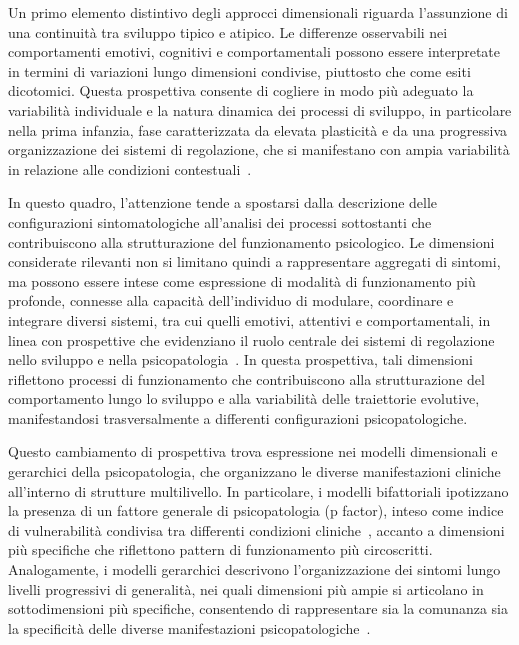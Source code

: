             Un primo elemento distintivo degli approcci dimensionali riguarda l'assunzione di una continuità tra sviluppo tipico e atipico. Le differenze osservabili nei comportamenti emotivi, cognitivi e comportamentali possono essere interpretate in termini di variazioni lungo dimensioni condivise, piuttosto che come esiti dicotomici. Questa prospettiva consente di cogliere in modo più adeguato la variabilità individuale e la natura dinamica dei processi di sviluppo, in particolare nella prima infanzia, fase caratterizzata da elevata plasticità e da una progressiva organizzazione dei sistemi di regolazione, che si manifestano con ampia variabilità in relazione alle condizioni contestuali~\cite{zelazo2020,beauchaine2019}.

            In questo quadro, l'attenzione tende a spostarsi dalla descrizione delle configurazioni sintomatologiche all'analisi dei processi sottostanti che contribuiscono alla strutturazione del funzionamento psicologico. Le dimensioni considerate rilevanti non si limitano quindi a rappresentare aggregati di sintomi, ma possono essere intese come espressione di modalità di funzionamento più profonde, connesse alla capacità dell'individuo di modulare, coordinare e integrare diversi sistemi, tra cui quelli emotivi, attentivi e comportamentali, in linea con prospettive che evidenziano il ruolo centrale dei sistemi di regolazione nello sviluppo e nella psicopatologia~\cite{zelazo2020,beauchaine2019}. In questa prospettiva, tali dimensioni riflettono processi di funzionamento che contribuiscono alla strutturazione del comportamento lungo lo sviluppo e alla variabilità delle traiettorie evolutive, manifestandosi trasversalmente a differenti configurazioni psicopatologiche.

            Questo cambiamento di prospettiva trova espressione nei modelli dimensionali e gerarchici della psicopatologia, che organizzano le diverse manifestazioni cliniche all'interno di strutture multilivello. In particolare, i modelli bifattoriali ipotizzano la presenza di un fattore generale di psicopatologia (p factor), inteso come indice di vulnerabilità condivisa tra differenti condizioni cliniche~\cite{caspi2014}, accanto a dimensioni più specifiche che riflettono pattern di funzionamento più circoscritti. Analogamente, i modelli gerarchici descrivono l'organizzazione dei sintomi lungo livelli progressivi di generalità, nei quali dimensioni più ampie si articolano in sottodimensioni più specifiche, consentendo di rappresentare sia la comunanza sia la specificità delle diverse manifestazioni psicopatologiche~\cite{kotov2017}.

